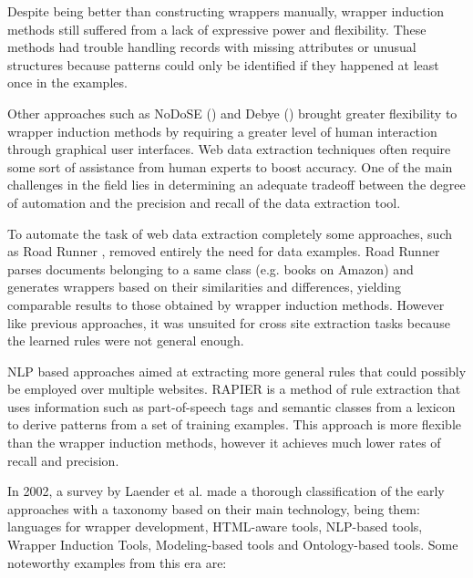 \documentclass[sigconf]{acmart}
\begin{document}
Despite being better than constructing wrappers manually, wrapper induction methods 
still suffered from a lack of expressive power and flexibility. These methods had 
trouble handling records with missing attributes or unusual structures because
patterns could only be identified if they happened at least once in the examples.

Other approaches such as NoDoSE (\cite{Adelberg1998}) and Debye (\cite{Laender2002a}) 
brought greater flexibility to wrapper induction methods by requiring a greater level 
of human interaction through graphical user interfaces. Web data extraction techniques often 
require some sort of assistance from human experts to boost accuracy. One of the main challenges 
in the field lies in determining an adequate tradeoff between the degree of automation and 
the precision and recall of the data extraction tool.

To automate the task of web data extraction completely some approaches,
such as Road Runner \cite{Crescenzi2001}, removed entirely the need for data examples.
Road Runner parses documents belonging to a same class (e.g. books on Amazon) and 
generates wrappers based on their similarities and differences, yielding comparable results 
to those obtained by wrapper induction methods. However like previous approaches, it was 
unsuited for cross site extraction tasks because the learned rules were not general enough.

NLP based approaches aimed at extracting more general rules that could possibly
be employed over multiple websites. RAPIER \cite{Califf1999} is a method of rule
extraction that uses information such as part-of-speech tags and semantic classes from
a lexicon to derive patterns from a set of training examples. This approach is more
flexible than the wrapper induction methods, however it achieves much lower rates of 
recall and precision.

In 2002, a survey by Laender et al. \cite{Laender2002} made a thorough classification of the
early approaches with a taxonomy based on their main technology, being them: languages for
wrapper development, HTML-aware tools, NLP-based tools, Wrapper Induction Tools,
Modeling-based tools and Ontology-based tools. Some noteworthy examples from this era
are: 
\end{document}
